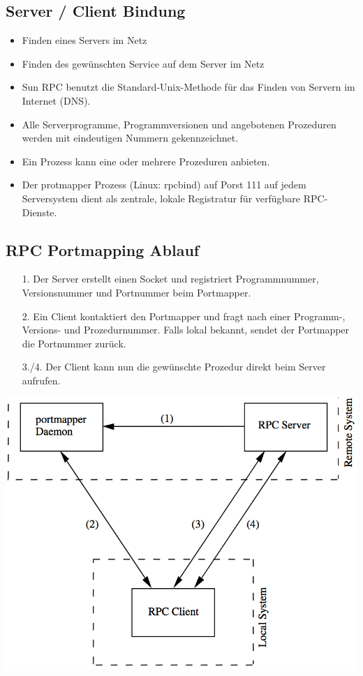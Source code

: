 \documentclass[10pt]{article}
\begin{document}
\subsection{Server / Client Bindung}
\begin{itemize}
	\item Finden eines Servers im Netz
	\item Finden des gewünschten Service auf dem Server im Netz
	\item Sun RPC benutzt die Standard-Unix-Methode für das Finden von Servern im Internet (DNS).
	\item Alle Serverprogramme, Programmversionen und angebotenen Prozeduren werden mit eindeutigen Nummern gekennzeichnet.
	\item Ein Prozess kann eine oder mehrere Prozeduren anbieten.
	\item Der protmapper Prozess (Linux: rpcbind) auf Porst 111 auf jedem Serversystem dient als zentrale, lokale Registratur für verfügbare RPC-Dienste.
\end{itemize}

\subsection{RPC Portmapping Ablauf}
\begin{itemize}
	\item[1.] Der Server erstellt einen Socket und registriert Programmnummer, Versionsnummer und Portnummer beim Portmapper.
	\item[2.] Ein Client kontaktiert den Portmapper und fragt nach einer Programm-, Versions- und Prozedurnummer. Falls lokal bekannt, sendet der Portmapper die Portnummer zurück.
	\item[3./4.] Der Client kann nun die gewünschte Prozedur direkt beim Server aufrufen. 
\end{itemize}
\begin{center}
	\includegraphics[scale=0.3]{rpc-ablauf.png}\\
\end{center}
\end{document}
